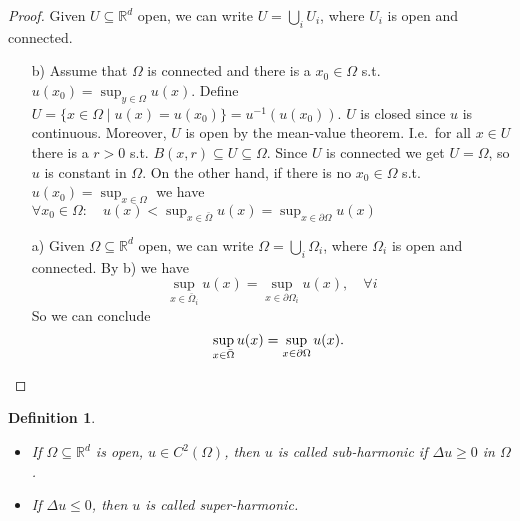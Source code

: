 \documentclass{report}
\theoremstyle{tommy}
\newtheorem{defn}{Definition}
\begin{document}
  \begin{proof}
    Given \(U \subseteq \mathbb{R}^d\) open, we can write \(U = \bigcup_i U_i\), where \(U_i\) is open and connected.
    \begin{enumerate}
      \item[b)] Assume that \(\Omega\) is connected and there is a \(x_0 \in \Omega\) s.t. \(u(x_0) = \sup_{y \in \Omega} u(x)\). Define \(U = \{ x \in \Omega \mid u(x) = u(x_0)\} = u^{-1}(u(x_0))\). \(U\) is closed since \(u\) is continuous.
      Moreover, \(U\) is open by the mean-value theorem. I.e.~for all \(x \in U\) there is a \(r > 0\) s.t. \(B(x,r) \subseteq U \subseteq \Omega\).
      Since \(U\) is connected we get \(U = \Omega\), so \(u\) is constant in \(\Omega\). On the other hand, if there is no \(x_0 \in \Omega\) s.t. \(u(x_0) = \sup_{x \in \Omega}\) we have \(\forall x_0 \in \Omega: \quad u(x) < \sup_{x \in \bar \Omega} u(x) = \sup_{x \in \partial \Omega} u(x)\)
      \item[a)] Given \(\Omega \subseteq \mathbb{R}^d\) open, we can write \(\Omega = \bigcup_i \Omega_i\), where \(\Omega_i\) is open and connected. By b) we have
        \[\sup_{x \in \bar \Omega_i} u(x) = \sup_{x \in \partial \Omega_i} u(x), \quad \forall i\]
        So we can conclude
        \[\quad \sup_{x \in \bar \Omega} u(x) = \sup_{x \in \partial \Omega} u(x). \qedhere\]
    \end{enumerate}
  \end{proof}

  \begin{defn}
    \begin{itemize}
      \item If \(\Omega \subseteq \mathbb{R}^d\) is open, \(u \in C^2(\Omega)\), then \(u\) is called \emph{sub-harmonic} if \(\Delta u \ge 0\) in \(\Omega\).
      \item If \(\Delta u \le 0\), then \(u\) is called \emph{super-harmonic}.
    \end{itemize}
  \end{defn}
\end{document}
